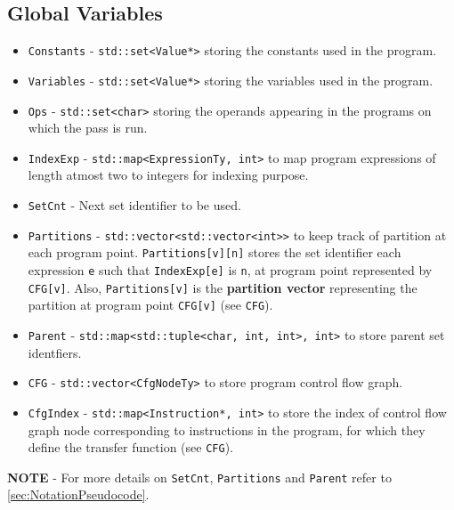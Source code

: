 \subsection{Global Variables}
\label{subsec:GlobalVariablesLLVM}
\begin{itemize} \tightlist
    \item \texttt{Constants} - \texttt{std::set<Value*>} storing the constants used in the program.
    \item \texttt{Variables} - \texttt{std::set<Value*>} storing the variables used in the program.
    \item \texttt{Ops} - \texttt{std::set<char>} storing the operands appearing in the programs on which the pass is run.
    \item \texttt{IndexExp} - \texttt{std::map<ExpressionTy, int>} to map program expressions of length atmost two to integers for indexing purpose.
    \item \texttt{SetCnt} - Next set identifier to be used.
    \item \texttt{Partitions} - \texttt{std::vector<std::vector<int>>} to keep track of partition at each program point. \texttt{Partitions[v][n]} stores the set identifier each expression \texttt{e} such that \texttt{IndexExp[e]} is \texttt{n}, at program point represented by \texttt{CFG[v]}. Also, \texttt{Partitions[v]} is the \textbf{partition vector} representing the partition at program point \texttt{CFG[v]} (see \texttt{CFG}).
    \item \texttt{Parent} - \texttt{std::map<std::tuple<char, int, int>, int>} to store parent set identfiers.
    \item \texttt{CFG} - \texttt{std::vector<CfgNodeTy>} to store program control flow graph.
    \item \texttt{CfgIndex} - \texttt{std::map<Instruction*, int>} to store the index of control flow graph node corresponding to instructions in the program, for which they define the transfer function (see \texttt{CFG}).
\end{itemize}
\textbf{NOTE} - For more details on \texttt{SetCnt}, \texttt{Partitions} and \texttt{Parent} refer to \autoref{sec:NotationPseudocode}.


